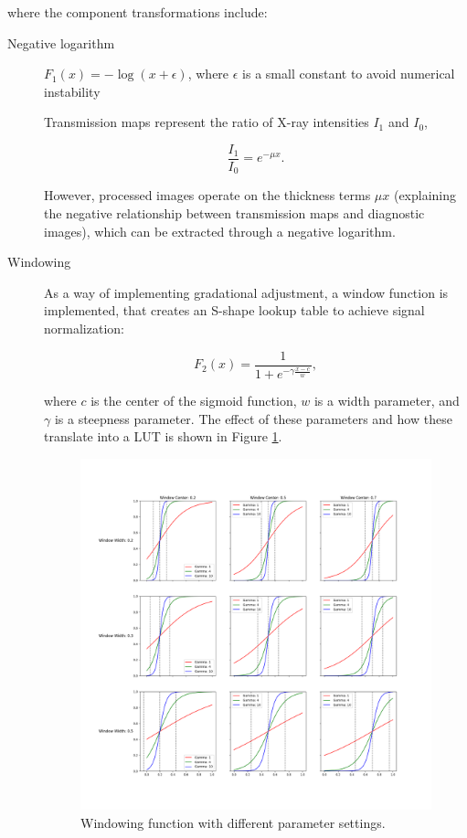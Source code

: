 \documentclass[nomenclature, english, bibtex]{kththesis}
\numberwithin{listing}{chapter}
\begin{document}
where the component transformations include:
\begin{description}

\item[Negative logarithm] $F_1(x) = -\log(x + \epsilon)$, where $\epsilon$ is a small constant to avoid numerical instability

    Transmission maps represent the ratio of X-ray intensities $I_1$ and $I_0$,

    \begin{equation}
        \frac{I_1}{I_0} = e^{-\mu x}.
    \end{equation}

    However, processed images operate on the thickness terms $\mu x$
    (explaining the negative relationship between transmission maps and diagnostic images),
    which can be extracted through a negative logarithm.

\item[Windowing] As a way of implementing gradational adjustment, a window function is implemented, that creates
an S-shape lookup table to achieve signal normalization:

\begin{equation}
    F_2(x) = \frac{1}{1+e^{-\gamma \frac{x - c}{w}}},
\end{equation}

where $c$ is the center of the sigmoid function, $w$ is a width parameter, and $\gamma$ is a steepness parameter.
The effect of these parameters and how these translate into a LUT is shown in Figure \ref{fig:windowingParams}.

\begin{figure}
    \centering
    \includegraphics[width=1.0\textwidth]{figures/window_params.png}
    \caption{Windowing function with different parameter settings.}
    \label{fig:windowingParams}
\end{figure}


\end{description}
\end{document}
